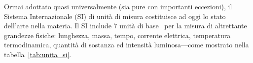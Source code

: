 Ormai adottato quasi universalmente (sia pure con importanti eccezioni), il
Sistema Internazionale (SI) di unità di misura costituisce ad oggi lo stato
dell'arte nella materia. Il SI include 7 unità di base~\cite{si_brochure}
per la misura di altrettante grandezze fisiche: lunghezza, massa, tempo,
corrente elettrica, temperatura termodinamica, quantità di sostanza ed intensità
luminosa---come mostrato nella tabella~\ref{tab:unita_si}.

\begin{table}[!htb]
\end{table}

